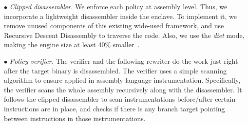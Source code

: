 \vspace{2pt}\noindent$\bullet$\textit{ Clipped disassembler.} 
We enforce each policy at assembly level. 
Thus, we incorporate a lightweight disassembler inside the enclave. To implement it, we remove unused components of this existing wide-used framework, and use Recursive Descent Disassembly to traverse the code. \DIFaddbegin {}\DIFaddend Also, we use the \textit{diet} mode, making the engine size at least 40\% smaller~\cite{quynh2014capstone}. \DIFaddbegin {}\DIFaddend 



\vspace{2pt}\noindent$\bullet$\textit{ Policy verifier.}\label{subsec-policyverifer}
The verifier and the following rewriter do the work just right after the target binary is disassembled\DIFdelbegin {}\DIFdelend . The verifier uses a simple scanning algorithm to ensure \DIFdelbegin {}\DIFdelend \DIFaddbegin {}\DIFaddend applied in assembly language instrumentation. 
Specifically, the verifier scans the whole assembly recursively along with the disassembler. It follows the clipped disassembler to scan instrumentations before/after certain instructions are in place, and checks if there is any branch target pointing between instructions in those instrumentations.


